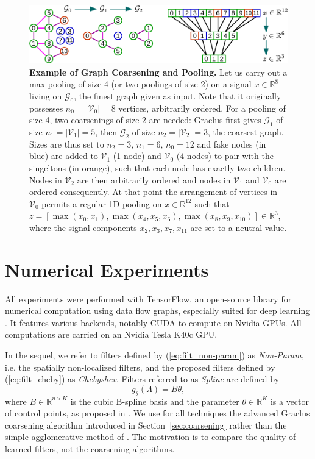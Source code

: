 \documentclass{article}
\newcommand{\G}{\mathcal{G}}
\newcommand{\V}{\mathcal{V}}
\newcommand{\R}{\mathbb{R}}
\newcommand{\secref}[1]{Section~\ref{sec:#1}}
\newcommand{\eqnref}[1]{(\ref{eq:#1})}
\newcommand{\bruna}{art:BrunaZarembaSzlamLeCun13DLgraphs,
art:HenaffBrunaLeCun15DLgraphs}
\begin{document}
\begin{figure}[ht]
\centering
\includegraphics[width=\textwidth]{images/coarsening_crop}
\caption{\textbf{Example of Graph Coarsening and Pooling.} Let us carry out a max pooling of size 4 (or two poolings of size 2) on a signal $x \in
\R^8$ living on $\G_0$, the finest graph given as input. Note that it originally
possesses $n_0 = |\V_0| = 8$ vertices, arbitrarily ordered. For a pooling of
size 4, two coarsenings of size 2 are needed: Graclus first gives $\G_1$ of size
$n_1 = |\V_1| = 5$, then $\G_2$ of size $n_2 = |\V_2| = 3$, the coarsest graph.
Sizes are thus set to $n_2 = 3$, $n_1 = 6$, $n_0 = 12$ and fake nodes (in blue)
are added to $\V_1$ (1 node) and $\V_0$ (4 nodes) to pair with the singeltons
(in orange), such that each node has exactly two children.  Nodes in $\V_2$ are
then arbitrarily ordered and nodes in $\V_1$ and $\V_0$ are ordered
consequently.  At that point the arrangement of vertices in $\V_0$ permits a
regular 1D pooling on $x \in \R^{12}$ such that $z = [\max(x_0,x_1),
\max(x_4,x_5,x_6), \max(x_8,x_9,x_{10})] \in \R^3$, where the signal components
$x_2,x_3,x_7,x_{11}$ are set to a neutral value.}
\label{fig:pooling}
\end{figure}














\section{Numerical Experiments}
All experiments were performed with TensorFlow, an open-source library for
numerical computation using data flow graphs, especially suited for deep
learning \cite{abadi_tensorflow_2016}. It features various backends, notably
CUDA to compute on Nvidia GPUs. All computations are carried on an Nvidia Tesla
K40c GPU.

In the sequel, we refer to filters defined by \eqnref{filt_non-param} as
\textit{Non-Param}, i.e. the spatially non-localized filters, and the proposed filters defined by \eqnref{filt_cheby} as
\textit{Chebyshev}. Filters referred to as \textit{Spline} are defined by
\begin{equation} \label{eq:filt_spline}
	g_\theta(\Lambda) = B \theta,
\end{equation}
where $B \in \R^{n \times K}$ is the cubic B-spline basis and the parameter
$\theta \in \R^K$ is a vector of control points, as proposed in \cite{\bruna}. We use for all techniques the advanced Graclus
coarsening algorithm introduced in \secref{coarsening} rather than the simple
agglomerative method of \cite{\bruna}. The motivation is to compare
the quality of learned filters, not the coarsening algorithms.
\end{document}
